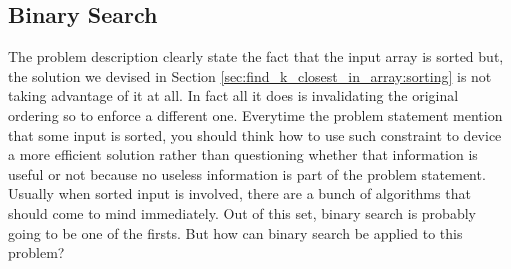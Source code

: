 

\subsection{Binary Search}
\label{find_k_closest_in_array:sec:binary_search}
The problem description clearly state the fact that the input array is sorted but, the solution we
devised in Section \ref{sec:find_k_closest_in_array:sorting} is not taking advantage of it at all.
In fact all it does is invalidating the original ordering so to enforce a different one. Everytime
the problem statement mention that some input is sorted, you should think how to use such constraint
to device a more efficient solution rather than questioning whether that information is useful or
not because no useless information is part of the problem statement. Usually when sorted input is
involved, there are a bunch of algorithms that should come to mind immediately. Out of this set, binary
search is probably going to be one of the firsts. But how can binary search be applied to this
problem?

